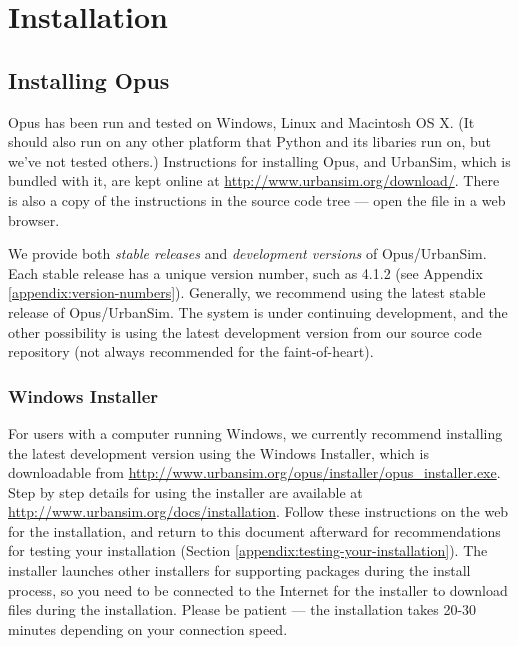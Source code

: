 
\chapter{Installation}
\label{appendix:installation}


\section{Installing Opus}

Opus has been run and tested on Windows, Linux and Macintosh OS X\@.  (It
should also run on any other platform that Python and its libaries run on,
but we've not tested others.)  Instructions for installing Opus, and
UrbanSim, which is bundled with it, are kept online at
\url{http://www.urbansim.org/download/}.  There is also a copy of the
instructions in the source code tree --- open the file 
 in a web browser.

We provide both \emph{stable releases} and \emph{development versions} of
Opus/UrbanSim.  Each stable release has a unique version number, such as
4.1.2 (see Appendix \ref{appendix:version-numbers}).
Generally, we recommend using the latest stable release of
Opus/UrbanSim.  The system is under continuing development, and the other
possibility is using the latest development version from our source code
repository (not always recommended for the faint-of-heart).

\subsection{Windows Installer}

For users with a computer running Windows, we currently recommend
installing the latest development version using the Windows Installer,
which is downloadable from
\url{http://www.urbansim.org/opus/installer/opus_installer.exe}.  Step by
step details for using the installer are available at
\url{http://www.urbansim.org/docs/installation}.  Follow these instructions
on the web for the installation, and return to this document afterward for
recommendations for testing your installation (Section
\ref{appendix:testing-your-installation}).  The installer launches other
installers for supporting packages during the install process, so you need
to be connected to the Internet for the installer to download files during
the installation.  Please be patient --- the installation takes 20-30
minutes depending on your connection speed.

